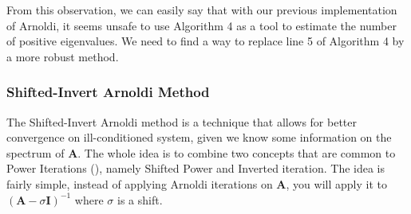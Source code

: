 \documentclass[11pt]{article}
\numberwithin{equation}{section}
\begin{document}
From this observation, we can easily say that with our previous implementation of Arnoldi, it seems unsafe to use Algorithm 4 as a tool to estimate the number of positive eigenvalues. We need to find a way to replace line 5 of Algorithm 4 by a more robust method.

\subsubsection{Shifted-Invert Arnoldi Method}
The Shifted-Invert Arnoldi method is a technique that allows for better convergence on ill-conditioned system, given we know some information on the spectrum of $\mathbf{A}$. The whole idea is to combine two concepts that are common to Power Iterations (\cite{saad2011numerical}), namely Shifted Power and Inverted iteration. The idea is fairly simple, instead of applying Arnoldi iterations on $\mathbf{A}$, you will apply it to $(\mathbf{A}-\sigma\mathbf{I})^{-1}$ where $\sigma$ is a shift.
\end{document}
